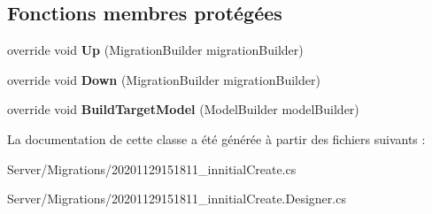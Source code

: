 \subsection*{Fonctions membres protégées}
\begin{DoxyCompactItemize}
\item 
\mbox{\label{class_mediwatch_1_1_server_1_1_migrations_1_1innitial_create_ae036630989af2c2f41f0b2257d35a8e0}} 
override void {\bfseries Up} (Migration\+Builder migration\+Builder)
\item 
\mbox{\label{class_mediwatch_1_1_server_1_1_migrations_1_1innitial_create_a8a02e197d3bd2cc0eefc6ac7814d1372}} 
override void {\bfseries Down} (Migration\+Builder migration\+Builder)
\item 
\mbox{\label{class_mediwatch_1_1_server_1_1_migrations_1_1innitial_create_ad7cc9104c9bb7f0274826a71631b8851}} 
override void {\bfseries Build\+Target\+Model} (Model\+Builder model\+Builder)
\end{DoxyCompactItemize}


La documentation de cette classe a été générée à partir des fichiers suivants \+:\begin{DoxyCompactItemize}
\item 
Server/\+Migrations/20201129151811\+\_\+innitial\+Create.\+cs\item 
Server/\+Migrations/20201129151811\+\_\+innitial\+Create.\+Designer.\+cs\end{DoxyCompactItemize}
